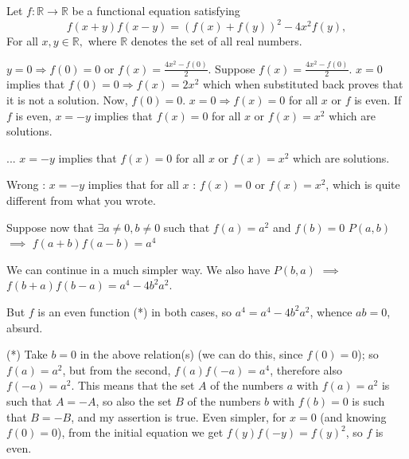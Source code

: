 \begin{solution}
	\begin{tcolorbox}Let $f:\mathbb{R}\to \mathbb R$ be a functional equation satisfying
\[f(x+y)f(x-y)=\left(f(x)+f(y)\right)^2-4x^2f(y),\]
For all $x,y\in\mathbb R,$ where $\mathbb R$ denotes the set of all real numbers.\end{tcolorbox}

$y=0\Longrightarrow f(0)=0$ or $f(x)=\frac{4x^2-f(0)}{2}$. Suppose $f(x)=\frac{4x^2-f(0)}{2}$. $x=0$ implies that $f(0)=0\Longrightarrow f(x)=2x^2$ which when substituted back proves that it is not a solution. Now, $f(0)=0$. $x=0\Longrightarrow f(x)=0$ for all $x$ or $f$ is even. If $f$ is even, $x=-y$ implies that $f(x)=0$ for all $x$ or $f(x)=x^2$ which are solutions.
\end{solution}



\begin{solution}
	\begin{tcolorbox} ... $x=-y$ implies that $f(x)=0$ for all $x$ or $f(x)=x^2$ which are solutions.\end{tcolorbox}

Wrong : $x=-y$ implies that for all $x$ : $f(x)=0$  or $f(x)=x^2$, which is quite different from what you wrote.
\end{solution}



\begin{solution}
	\begin{tcolorbox}Suppose now that $\exists a\ne 0, b\ne 0$ such that $f(a)=a^2$ and $f(b)=0$
$P(a,b)$ $\implies$ $f(a+b)f(a-b)=a^4$\end{tcolorbox}
We can continue in a much simpler way. We also have $P(b,a)$ $\implies$ $f(b+a)f(b-a)=a^4 - 4b^2a^2$.

But $f$ is an even function (*) in both cases, so $a^4 = a^4 - 4b^2a^2$, whence $ab = 0$, absurd.

(*) Take $b=0$ in the above relation(s) (we can do this, since $f(0) = 0$); so $f(a) = a^2$, but from the second, $f(a)f(-a) = a^4$, therefore also $f(-a) = a^2$. This means that the set $A$ of the numbers $a$ with $f(a) = a^2$ is such that $A = -A$, so also the set $B$ of the numbers $b$ with $f(b) = 0$ is such that $B = -B$, and my assertion is true.
Even simpler, for $x=0$ (and knowing $f(0)=0$), from the initial equation we get $f(y)f(-y) = f(y)^2$, so $f$ is even.
\end{solution}




